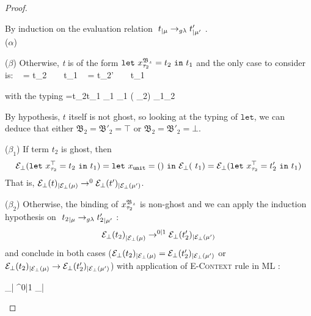 \begin{proof}
	\begin{adjustwidth}{1em}{-3em}
	By induction on the evaluation relation $~t_{|\mu} \rightarrow_{g\lambda} t'_{|\mu'} ~$.  \\ 
	\noindent ($\alpha$) \quad 

	
	\noindent ($\beta$)  \quad Otherwise, \textit{t} is of the form 
	$\mathtt{let}~x^{\mathfrak{B_{2}}}_{\tau_{2}} = t_2 ~ \mathtt{in}~ t_1$ and the only case to consider is:
	{ ~  = t_{2} ~ ~ {t_{1}}\mem
		\rightarrow 
		 ~  = t_{2}' ~ ~ {t_{1}}\memp}
	
	with the typing 
		{\typrule
			{=t_{2}t_{1}}
			{\tau_{1}}
			{_{1} \vee 
			(\wedge
			_{2})}
			{\Sigma_{1}\vee\Sigma_{2}}}
			
	By hypothesis, $t$ itself is not ghost, so looking 
	at the typing of $\mathtt{let}$, we can deduce that either 
	$\mathfrak{B_2} = \mathfrak{B'_2} = \top$ or
	$\mathfrak{B_2} = \mathfrak{B'_2} = \bot$. 
	 	
	\noindent ($\beta_1$)  \quad If term $t_2$ is ghost, then 
$$\mathcal{E}_{\bot}(\mathtt{let}~x^{\top}_{\tau_{2}}= t_2~\mathtt{in}~t_1) = 
\mathtt{let}~x_{\mathtt{unit}} = ()~\mathtt{in}~\mathcal{E}_{\bot}(~t_1) = \mathcal{E}_{\bot}(\mathtt{let}~x^{\top}_{\tau_{2}}= t'_2~\mathtt{in}~t_1) $$
That is, $\mathcal{E}_{\bot}(t)_{|\mathcal{E}_{\bot}(\mu)} \rightarrow^{0} \mathcal{E}_{\bot}(t')_{|\mathcal{E}_{\bot}(\mu')}$.
	
	\noindent ($\beta_2$) Otherwise, the binding of $x^{\mathfrak{B_{2}}}_{\tau_{2}}$
	is non-ghost and we can apply the induction hypothesis on  
	$~{t_2}_{|\mu} \rightarrow_{g\lambda} {t'_2}_{|\mu'} ~$: 
	  $$ {\mathcal{E}_{\bot}(t_2)}_{|\mathcal{E}_{\bot}(\mu)} \rightarrow^{0|1} 
	  \mathcal{E}_{\bot}(t'_2)_{|\mathcal{E}_{\bot}(\mu')} $$ and conclude in both cases 
($\mathcal{E}_{\bot}(t_2)_{|\mathcal{E}_{\bot}(\mu)} = \mathcal{E}_{\bot}(t'_2)_{|\mathcal{E}_{\bot}(\mu')}$ or 
	$\mathcal{E}_{\bot}(t_2)_{|\mathcal{E}_{\bot}(\mu)} \rightarrow 
	  \mathcal{E}_{\bot}(t'_2)_{|\mathcal{E}_{\bot}(\mu')}$)	  
	   with application of 
	  \textsc{E-Context} rule in ML :
	  
	{{}_{|\ebot{\mu}} \rightarrow^{0|1} {}_{|}}
	

\end{adjustwidth}	
\end{proof}






